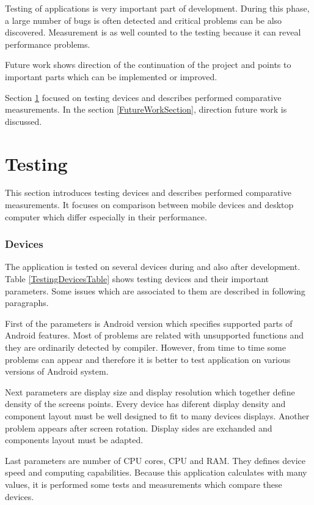 Testing of applications is very important part of development. During this phase, a large number of bugs is often
detected and critical problems can be also discovered. Measurement is as well counted to the testing because it can
reveal performance problems.

Future work shows direction of the continuation of the project and points to important parts which can be implemented or
improved.

Section \ref{TestingSection} focused on testing devices and describes performed comparative measurements. In the section
\ref{FutureWorkSection}, direction future work is discussed.

\section{Testing}\label{TestingSection}
This section introduces testing devices and describes performed comparative measurements. It focuses on comparison
between mobile devices and desktop computer which differ especially in their performance.

\subsubsection{Devices}
The application is tested on several devices during and also after development. Table \ref{TestingDevicesTable} shows
testing devices and their important parameters. Some issues which are associated to them are described in following
paragraphs.

First of the parameters is Android version which specifies supported parts of Android features. Most of problems are
related with unsupported functions and they are ordinarily detected by compiler. However, from time to time some
problems can appear and therefore it is better to test application on various versions of Android system.

Next parameters are display size and display resolution which together define density of the screens points. Every
device has diferent display density and component layout must be well designed to fit to many devices displays. Another
problem appears after screen rotation. Display sides are exchanded and components layout must be adapted.

Last parameters are number of CPU cores, CPU and RAM. They defines device speed and computing capabilities. Because this
application calculates with many values, it is performed some tests and measurements which compare these devices.

